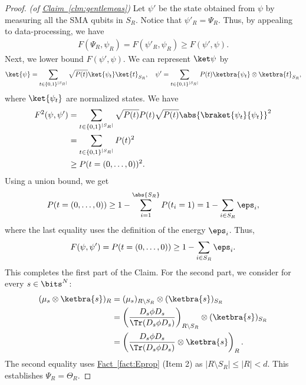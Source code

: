 \documentclass[11pt]{article}
\newcommand{\expref}[2]{\texorpdfstring{\hyperref[#2]{#1~\ref{#2}}}{#1~\ref{#2}}}
\begin{document}
%
%
%
%
%
%
%
%
%

\begin{proof}\textit{(of \expref{Claim}{clm:gentlemeas})}
Let $\psi'$ be the state obtained from $\psi$ by measuring all the SMA qubits in $S_R$. Notice that $\psi'_R=\Psi_R$. Thus, by appealing to data-processing, we have
\begin{align}
F(\Psi_R,\psi_R)=F(\psi'_R,\psi_R)\geq F(\psi',\psi).    
\end{align}
Next, we lower bound $F(\psi',\psi)$. We can represent $\ket \psi$ by
\begin{align}
\ket{\psi}=\sum_{t\in \{0,1\}^{|S_R|}}\sqrt{P(t)}\ket{\psi_t}\ket{t}_{S_R},\quad \psi'=\sum_{t\in \{0,1\}^{|S_R|}}P(t)\ketbra{\psi_t}\otimes\ketbra{t}_{S_R},
\end{align}
where $\ket{\psi_t}$ are normalized states. We have
\begin{align}
F^2(\psi,\psi') &= \sum_{t\in \{0,1\}^{|S_R|}}\sqrt{P(t)}P(t)\sqrt{P(t)}\abs{\braket{\psi_t}{\psi_t}}^2 \\ &=\sum_{t\in \{0,1\}^{|S_R|}}P(t)^2 \\
&\geq P(t = (0,\ldots,0))^2.
\end{align}
Using a union bound, we get 
\begin{align}
P(t = (0,\ldots,0)) \geq 1- \sum_{i=1}^{\abs{S_R}}P(t_i=1)= 1-\sum_{i\in S_R}\eps_i,
\end{align}
where the last equality uses the definition of the energy $\eps_i$. Thus,
\begin{align}
F(\psi,\psi')= P(t = (0,\ldots,0)) \geq 1-\sum_{i\in S_R}\eps_i.
\end{align}
This completes the first part of the Claim. For the second part, we consider for every $s\in \bits^N$:
\begin{align}
(\mu_s\otimes \ketbra{s})_{R}&=(\mu_s)_{R\setminus S_R}\otimes (\ketbra{s})_{S_R}\\
&=\left(\frac{D_s\phi D_s}{\Tr(D_s\phi D_s)}\right)_{R\setminus S_R}\otimes (\ketbra{s})_{S_R}\\
&=\left(\frac{D_s\phi D_s}{\Tr(D_s\phi D_s)}\otimes \ketbra{s}\right)_{R}.
\end{align}
The second equality uses \expref{Fact}{fact:Eprop} (Item 2) as $|R\setminus S_R|\leq |R|<d$. This establishes $\Psi_R=\Theta_R$.
\end{proof}
\end{document}

